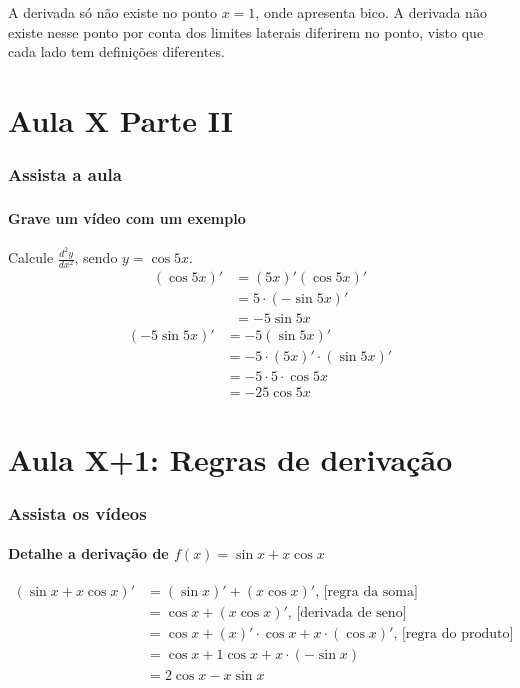 \documentclass[12pt]{article}
\theoremstyle{definition}
\begin{document}
A derivada só não existe no ponto \(x=1\), onde apresenta bico. A derivada não existe nesse ponto por conta dos limites laterais diferirem no ponto, visto que cada lado tem definições diferentes.

\part{Aula X Parte II}
\setcounter{section}{0}

\section{Assista a aula}

\section{}

\subsection{Grave um vídeo com um exemplo}
Calcule \(\frac{d^2y}{dx^2}\), sendo \(y = \cos{5x}\).
\begin{align*}
    (\cos{5x})'
    &= (5x)' (\cos{5x})' \\
    &= 5 \cdot (-\sin{5x})' \\
    &= -5 \sin{5x}
\end{align*}
\begin{align*}
    (-5 \sin{5x})'
    &= -5 (\sin{5x})' \\
    &= -5 \cdot (5x)' \cdot (\sin{5x})' \\
    &= -5 \cdot 5 \cdot \cos{5x} \\
    &= -25 \cos{5x}
\end{align*}


\part{Aula X+1: Regras de derivação}
\setcounter{section}{0}
\section{Assista os vídeos}
\subsection{Detalhe a derivação de \(f(x) = \sin{x}+x\cos{x}\)}
\begin{align*}
    (\sin{x}+x\cos{x})'
    &= (\sin{x})' + (x\cos{x})' \text{, [regra da soma] } \\
    &= \cos{x} + (x\cos{x})' \text{, [derivada de seno] } \\
    &= \cos{x} + (x)'\cdot\cos{x} + x \cdot (\cos{x})' \text{, [regra do produto] } \\
    &= \cos{x} + 1\cos{x} + x \cdot (-\sin{x}) \\
    &= 2\cos{x} - x\sin{x}
\end{align*}
\end{document}
